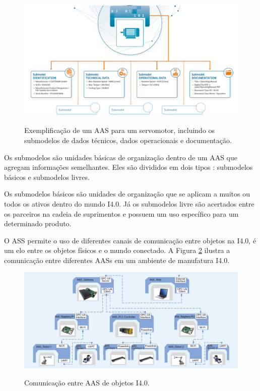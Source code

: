 \documentclass[
	12pt,				%
	oneside,			%
	a4paper,			%
	english,			%
	brazil				%
]{abntex2}
\begin{document}
	\begin{figure}[H]
		\centering
		\caption{Exemplificação de um AAS para um servomotor, incluindo os submodelos de dados técnicos, dados operacionais e documentação.}
		\includegraphics[width=1\textwidth]{aas-submodelos.png}
		\label{fig:aas-submodelos}
	\end{figure}

	Os submodelos são unidades básicas de organização dentro de um AAS que agregam informações semelhantes. Eles são divididos em dois tipos \cite{germany2019detailsaas}: submodelos básicos e submodelos livres.
	
	Os submodelos básicos são unidades de organização que se aplicam a muitos ou todos os ativos dentro do mundo I4.0. Já os submodelos livre são acertados entre os parceiros na cadeia de suprimentos e possuem um uso específico para um determinado produto.
	
	O ASS permite o uso de diferentes canais de comunicação entre objetos na I4.0, é um elo entre os objetos físicos e o mundo conectado. A Figura \ref{fig:aas-conexao} ilustra a comunicação entre diferentes AASs em um ambiente de manufatura I4.0.
	
	\begin{figure}[H]
		\centering
		\caption{Comunicação entre AAS de objetos I4.0.}
		\includegraphics[width=1\textwidth]{aas-conexao.png}
		\label{fig:aas-conexao}
	\end{figure}
\end{document}

